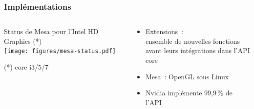 \begin{frame}
  \frametitle{Implémentations}
  \begin{columns}
    \begin{column}{.5\textwidth}
      \begin{center}
        Status de Mesa pour l'Intel HD Graphics {\tiny (*)} \\[.5em]
        \texttt{[image: figures/mesa-status.pdf]} \\ %
      \end{center}
      {\tiny (*) core i3/5/7}
    \end{column}
    \begin{column}{.5\textwidth}
      \begin{itemize}
      \item Extensions~: \\
        ensemble de nouvelles fonctions \\
        avant leurs intégrations dans l'API core
      \item Mesa~: OpenGL sous Linux
      \item Nvidia implémente 99,9\,\% de l'API %
      \end{itemize}
    \end{column}
  \end{columns}
\end{frame}

